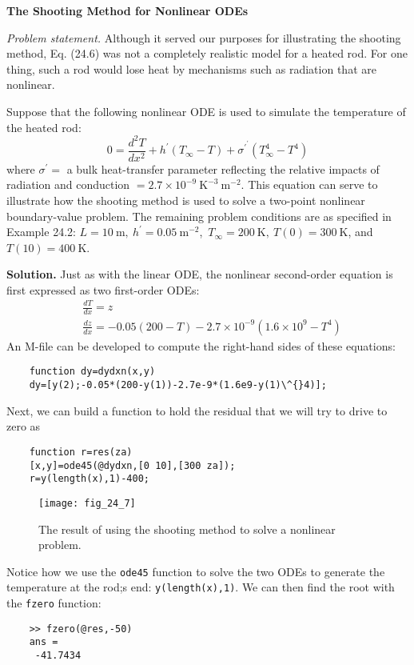 \documentclass[../main.tex]{subfiles}
\begin{document}
\begin{exmp}
    \textbf{The Shooting Method for Nonlinear ODEs}

    \noindent\textit{Problem statement.} Although it served our purposes for illustrating the shooting method, Eq. (24.6) was not a completely realistic model for a heated rod. For one thing, such a rod would lose heat by mechanisms such as radiation that are nonlinear.

    Suppose that the following nonlinear ODE is used to simulate the temperature of the heated rod:
    $$
    0=\frac{d^{2} T}{d x^{2}}+h^{\prime}\left(T_{\infty}-T\right)+\sigma^{\prime^{\prime}}\left(T_{\infty}^{4}-T^{4}\right)
    $$
    where $\sigma^{\prime}=$ a bulk heat-transfer parameter reflecting the relative impacts of radiation and conduction $=2.7 \times 10^{-9} \mathrm{~K}^{-3} \mathrm{~m}^{-2}$. This equation can serve to illustrate how the shooting method is used to solve a two-point nonlinear boundary-value problem. The remaining problem conditions are as specified in Example 24.2: $L=10 \mathrm{~m},\ h^{\prime}=0.05 \mathrm{~m}^{-2}$,\ $T_{\infty}=200 \mathrm{~K},\ T(0)=300 \mathrm{~K}$, and $T(10)=400 \mathrm{~K}$.
    
    \noindent\textbf{Solution.} Just as with the linear ODE, the nonlinear second-order equation is first expressed as two first-order ODEs:
    $$
    \begin{aligned}
    &\frac{d T}{d x}=z \\
    &\frac{d z}{d x}=-0.05(200-T)-2.7 \times 10^{-9}\left(1.6 \times 10^{9}-T^{4}\right)
    \end{aligned}
    $$
    An M-file can be developed to compute the right-hand sides of these equations:\vspace*{\smallskipamount}
    \begin{lstlisting}
    function dy=dydxn(x,y)
    dy=[y(2);-0.05*(200-y(1))-2.7e-9*(1.6e9-y(1)\^{}4)];
    \end{lstlisting}
    

    \noindent Next, we can build a function to hold the residual that we will try to drive to zero as\vspace*{\smallskipamount}
    \begin{lstlisting}
    function r=res(za)
    [x,y]=ode45(@dydxn,[0 10],[300 za]);
    r=y(length(x),1)-400;
    \end{lstlisting}
    

    \begin{figure}[H]
        \centering
        \texttt{[image: fig\_24\_7]}
       \caption{\textsf{The result of using the shooting method to solve a nonlinear problem.}}\label{fig:fig_24_7}
    \end{figure}
    \noindent Notice how we use the \texttt{ode45} function to solve the two ODEs to generate the temperature
    at the rod;s end: \texttt{y(length(x),1)}. We can then find the root with the \texttt{fzero} function:
    \begin{lstlisting}
    >> fzero(@res,-50)
    ans =
     -41.7434
    \end{lstlisting}
    


\end{exmp}
\end{document}
